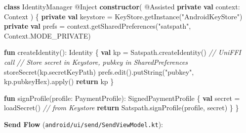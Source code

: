\documentclass[
]{article}
\newenvironment{Shaded}{}{}
\newcommand{\CommentTok}[1]{\textcolor[rgb]{0.38,0.63,0.69}{\textit{#1}}}
\newcommand{\DataTypeTok}[1]{\textcolor[rgb]{0.56,0.13,0.00}{#1}}
\newcommand{\FunctionTok}[1]{\textcolor[rgb]{0.02,0.16,0.49}{#1}}
\newcommand{\KeywordTok}[1]{\textcolor[rgb]{0.00,0.44,0.13}{\textbf{#1}}}
\newcommand{\NormalTok}[1]{#1}
\newcommand{\OperatorTok}[1]{\textcolor[rgb]{0.40,0.40,0.40}{#1}}
\newcommand{\StringTok}[1]{\textcolor[rgb]{0.25,0.44,0.63}{#1}}
\newcommand{\VariableTok}[1]{\textcolor[rgb]{0.10,0.09,0.49}{#1}}
\begin{document}
\begin{Shaded}
\begin{Highlighting}[]
\KeywordTok{class}\NormalTok{ IdentityManager @Inject }\KeywordTok{constructor}\OperatorTok{(}
\NormalTok{    @}\VariableTok{Assisted} \KeywordTok{private} \KeywordTok{val} \VariableTok{context}\OperatorTok{:} \DataTypeTok{Context}
\OperatorTok{)} \OperatorTok{\{}
    \KeywordTok{private} \KeywordTok{val} \VariableTok{keystore} \OperatorTok{=}\NormalTok{ KeyStore}\OperatorTok{.}\NormalTok{getInstance}\OperatorTok{(}\StringTok{"AndroidKeyStore"}\OperatorTok{)}
    \KeywordTok{private} \KeywordTok{val} \VariableTok{prefs} \OperatorTok{=}\NormalTok{ context}\OperatorTok{.}\NormalTok{getSharedPreferences}\OperatorTok{(}\StringTok{"satspath"}\OperatorTok{,}\NormalTok{ Context}\OperatorTok{.}\NormalTok{MODE\_PRIVATE}\OperatorTok{)}

    \KeywordTok{fun} \FunctionTok{createIdentity}\OperatorTok{():} \DataTypeTok{Identity} \OperatorTok{\{}
        \KeywordTok{val} \VariableTok{kp} \OperatorTok{=}\NormalTok{ Satspath}\OperatorTok{.}\NormalTok{createIdentity}\OperatorTok{()}  \CommentTok{// UniFFI call}
        \CommentTok{// Store secret in Keystore, pubkey in SharedPreferences}
\NormalTok{        storeSecret}\OperatorTok{(}\NormalTok{kp}\OperatorTok{.}\NormalTok{secretKeyPath}\OperatorTok{)}
\NormalTok{        prefs}\OperatorTok{.}\NormalTok{edit}\OperatorTok{().}\NormalTok{putString}\OperatorTok{(}\StringTok{"pubkey"}\OperatorTok{,}\NormalTok{ kp}\OperatorTok{.}\NormalTok{pubkeyHex}\OperatorTok{).}\NormalTok{apply}\OperatorTok{()}
        \KeywordTok{return}\NormalTok{ kp}
    \OperatorTok{\}}

    \KeywordTok{fun} \FunctionTok{signProfile}\OperatorTok{(}\VariableTok{profile}\OperatorTok{:} \DataTypeTok{PaymentProfile}\OperatorTok{):} \DataTypeTok{SignedPaymentProfile} \OperatorTok{\{}
        \KeywordTok{val} \VariableTok{secret} \OperatorTok{=}\NormalTok{ loadSecret}\OperatorTok{()}  \CommentTok{// from Keystore}
        \KeywordTok{return}\NormalTok{ Satspath}\OperatorTok{.}\NormalTok{signProfile}\OperatorTok{(}\NormalTok{profile}\OperatorTok{,}\NormalTok{ secret}\OperatorTok{)}
    \OperatorTok{\}}
\OperatorTok{\}}
\end{Highlighting}
\end{Shaded}

\textbf{Send Flow} (\texttt{android/ui/send/SendViewModel.kt}):
\end{document}
